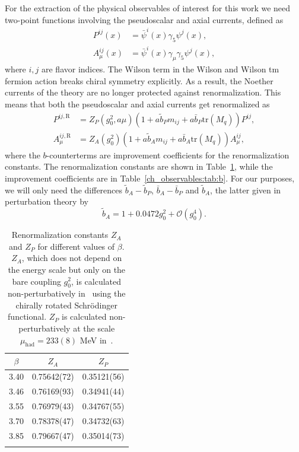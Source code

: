 For the extraction of the physical observables of interest for this work we need two-point functions involving the pseudoscalar and axial currents, defined as
\begin{align}
\label{ch_observables:eq:bilinears}
P^{ij}(x)&=\bar{\psi}^{i}(x)\gamma_5\psi^{j}(x),\\
A_{\mu}^{ij}(x)&=\bar{\psi}^i(x)\gamma_{\mu}\gamma_5\psi^{j}(x),
\end{align}
where $i,j$ are flavor indices. The Wilson term in the Wilson and Wilson tm fermion action breaks chiral symmetry explicitly. As a result, the Noether currents of the theory are no longer protected against renormalization. This means that both the pseudoscalar and axial currents get renormalized as
\begin{align}
\label{ch_observables:eq:corr_ren}
P^{ij,{\textrm{R}}}&=Z_P(g_0^2,a\mu)\left(1+a\tilde{b}_Pm_{ij}+a\bar{b}_P{\textrm{tr}}\left(M_q\right)\right)P^{ij}, \\
A_{\mu}^{ij,{\textrm{R}}}&=Z_A(g_0^2)\left(1+a\tilde{b}_Am_{ij}+a\bar{b}_A{\textrm{tr}}\left(M_q\right)\right)A_{\mu}^{ij},
\end{align}
where the $b$-counterterms are improvement coefficients for the renormalization constants. The renormalization constants are shown in Table~\ref{ch_observables:tab:Z}, while the improvement coefficients are in Table~\ref{ch_observables:tab:b}. For our purposes, we will only need the differences $\tilde{b}_A-\tilde{b}_P$, $\bar{b}_A-\bar{b}_P$ and $\tilde{b}_A$, the latter given in perturbation theory by~\citep{Taniguchi:1998pf}
\begin{equation}
\label{ch_observables:eq:bA}
\tilde{b}_A=1+0.0472g_0^2+\mathcal{O}(g_0^4).
\end{equation}

\begin{longtable}{c c c}
    \label{ch_observables:tab:Z}
    $\beta$ & $Z_A$ & $Z_P$ \\
    \toprule
    3.40 & 0.75642(72) & 0.35121(56) \\
    3.46 & 0.76169(93) & 0.34941(44) \\
    3.55 & 0.76979(43) & 0.34767(55) \\
    3.70 & 0.78378(47) & 0.34732(63) \\
    3.85 & 0.79667(47) & 0.35014(73) \\
    \bottomrule
    \caption{Renormalization constants $Z_A$ and $Z_P$ for different values of $\beta$. $Z_A$, which does not depend on the energy scale but only on the bare coupling $g_0^2$, is calculated non-perturbatively in~\citep{DallaBrida:2018tpn} using the chirally rotated Schrödinger functional. $Z_P$ is calculated non-perturbatively at the scale $\mu_{\textrm{had}}=233(8)$ MeV in~\cite{Campos:2018ahf}.}
\end{longtable}

